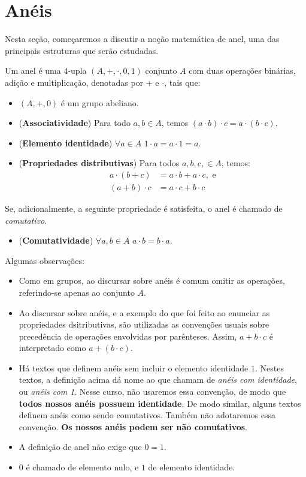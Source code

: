 
\section{Anéis}
Nesta seção, começaremos a discutir a noção matemática de anel, uma das principais estruturas que serão estudadas.
\begin{definition}[Anel]
    Um anel é uma $4$-upla $(A, +, \cdot, 0, 1)$ conjunto $A$ com duas operações binárias, adição e multiplicação, denotadas por $+$ e $\cdot$, tais que:
    \begin{itemize}
        \item $(A, +, 0)$ é um grupo abeliano.
        \item (\textbf{Associatividade}) Para todo $a, b \in A$, temos $(a \cdot b)\cdot c = a\cdot(b\cdot c)$.
        \item (\textbf{Elemento identidade}) $\forall a \in A$ $1 \cdot a = a \cdot 1 = a$.
        \item (\textbf{Propriedades distributivas}) Para todos $a, b, c, \in A$, temos:
        \begin{align*}
            a \cdot (b + c) &= a \cdot b + a \cdot c, \text{ e}\\
            (a + b) \cdot c &= a \cdot c + b \cdot c
        \end{align*}
    \end{itemize}
    Se, adicionalmente, a seguinte propriedade é satisfeita, o anel é chamado de \emph{comutativo}.
    \begin{itemize}
        \item (\textbf{Comutatividade}) $\forall a, b \in A$ $a \cdot b = b \cdot a$.
    \end{itemize}
\end{definition}

Algumas observações:
\begin{itemize}
    \item Como em grupos, ao discursar sobre anéis é comum omitir as operações, referindo-se apenas ao conjunto $A$.
    \item Ao discursar sobre anéis, e a exemplo do que foi feito ao enunciar as propriedades dsitributivas, são utilizadas as convenções usuais sobre precedência de operações envolvidas por parênteses. Assim, $a + b \cdot c$ é interpretado como $a + (b \cdot c)$.
    \item Há textos que definem anéis sem incluir o elemento identidade $1$. Nestes textos, a definição acima dá nome ao que chamam de \emph{anéis com identidade}, ou \emph{anéis com 1}. Nesse curso, não usaremos essa convenção, de modo que \textbf{todos nossos anéis possuem identidade}. De modo similar, alguns textos definem anéis como sendo comutativos. Também não adotaremos essa convenção. \textbf{Os nossos anéis podem ser não comutativos}.
    \item A definição de anel não exige que $0=1$.
    \item $0$ é chamado de elemento nulo, e $1$ de elemento identidade.
\end{itemize}

